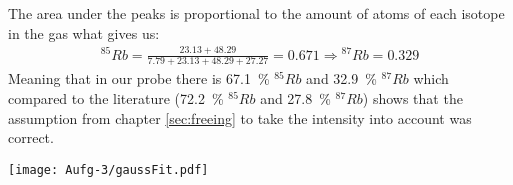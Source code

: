 The area under the peaks is proportional to the amount of atoms of each isotope in the gas what gives us:
\begin{gather}
    ^{85}Rb = \frac{23.13+48.29}{7.79+23.13+48.29+27.27} = 0.671 \Rightarrow  {^{87}Rb} = 0.329
\end{gather}
Meaning that in our probe there is \SI{67.1}{\percent} $^{85}Rb$ and \SI{32.9}{\percent} $^{87}Rb$ which compared to the literature (\SI{72.2}{\percent} $^{85}Rb$ and \SI{27.8}{\percent} $^{87}Rb$) shows that the assumption from chapter \ref{sec:freeing} to take the intensity into account was correct.
\begin{center}
    \texttt{[image: Aufg-3/gaussFit.pdf]}
    \label{image:gaussFit}
\end{center}